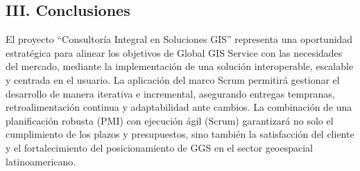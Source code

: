 \subsection{III. Conclusiones}
El proyecto ``Consultoría Integral en Soluciones GIS'' representa una oportunidad estratégica para alinear los objetivos de Global GIS Service con las necesidades del mercado, mediante la implementación de una solución interoperable, escalable y centrada en el usuario. La aplicación del marco Scrum permitirá gestionar el desarrollo de manera iterativa e incremental, asegurando entregas tempranas, retroalimentación continua y adaptabilidad ante cambios. La combinación de una planificación robusta (PMI) con ejecución ágil (Scrum) garantizará no solo el cumplimiento de los plazos y presupuestos, sino también la satisfacción del cliente y el fortalecimiento del posicionamiento de GGS en el sector geoespacial latinoamericano.